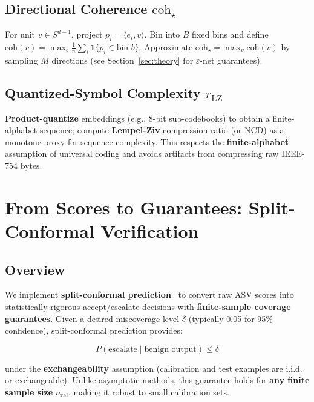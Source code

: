 \documentclass[11pt]{article}
\begin{document}
\subsection{Directional Coherence $\mathrm{coh}_\star$}
\label{sec:signal-coh}

For unit $v\in S^{d-1}$, project $p_i=\langle e_i,v\rangle$. Bin into $B$ fixed bins and define $\mathrm{coh}(v)=\max_b \frac{1}{n}\sum_i \mathbf{1}\{p_i\in\text{bin }b\}$. Approximate $\mathrm{coh}_\star=\max_v \mathrm{coh}(v)$ by sampling $M$ directions (see Section~\ref{sec:theory} for $\varepsilon$-net guarantees).

\subsection{Quantized-Symbol Complexity $r_{\mathrm{LZ}}$}
\label{sec:signal-rlz}

\textbf{Product-quantize} embeddings (e.g., 8-bit sub-codebooks) to obtain a finite-alphabet sequence; compute \textbf{Lempel-Ziv} compression ratio (or NCD) as a monotone proxy for sequence complexity. This respects the \textbf{finite-alphabet} assumption of universal coding and avoids artifacts from compressing raw IEEE-754 bytes.

\section{From Scores to Guarantees: Split-Conformal Verification}
\label{sec:conformal}

\subsection{Overview}
\label{sec:conformal-overview}

We implement \textbf{split-conformal prediction}~\cite{vovk2005algorithmic,lei2018distribution,angelopoulos2023gentle} to convert raw ASV scores into statistically rigorous accept/escalate decisions with \textbf{finite-sample coverage guarantees}. Given a desired miscoverage level $\delta$ (typically 0.05 for 95\% confidence), split-conformal prediction provides:

\begin{equation}
P(\text{escalate} \mid \text{benign output}) \le \delta
\end{equation}

under the \textbf{exchangeability} assumption (calibration and test examples are i.i.d. or exchangeable). Unlike asymptotic methods, this guarantee holds for \textbf{any finite sample size} $n_{\text{cal}}$, making it robust to small calibration sets.
\end{document}
